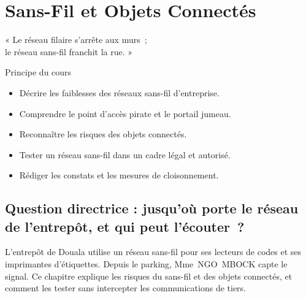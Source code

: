 
\chapter{Sans-Fil et Objets Connectés}
\label{chap:sansfil}

\epigraph{%
    « Le réseau filaire s'arrête aux murs~;\\
    le réseau sans-fil franchit la rue. »%
}{Principe du cours}


\begin{boxobjectifs}
\begin{itemize}
    \item Décrire les faiblesses des réseaux sans-fil d'entreprise.
    \item Comprendre le point d'accès pirate et le portail jumeau.
    \item Reconnaître les risques des objets connectés.
    \item Tester un réseau sans-fil dans un cadre légal et autorisé.
    \item Rédiger les constats et les mesures de cloisonnement.
\end{itemize}
\end{boxobjectifs}

\bigskip

\section*{Question directrice : jusqu'où porte le réseau de l'entrepôt, et qui peut l'écouter~?}

L'entrepôt de Douala utilise un réseau sans-fil pour ses lecteurs de codes
et ses imprimantes d'étiquettes. Depuis le parking, Mme~NGO~MBOCK capte le
signal. Ce chapitre explique les risques du sans-fil et des objets
connectés, et comment les tester sans intercepter les communications de
tiers.

